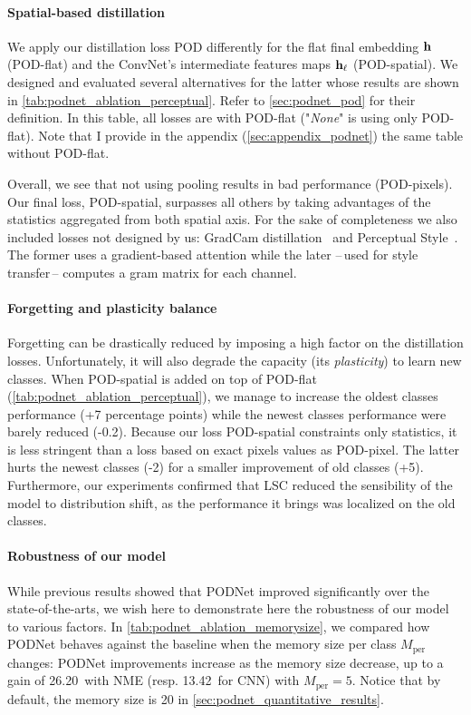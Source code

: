 \label{sec:podnet_ablation_pooling}
\paragraph{Spatial-based distillation} We apply our distillation loss \ac{POD} differently for the
flat final embedding $\mathbf{h}$ (POD-flat) and the \ac{ConvNet}'s intermediate features maps $\mathbf{h}_\ell$
(POD-spatial). We designed and evaluated several alternatives for the latter whose results are shown
in \autoref{tab:podnet_ablation_perceptual}.
Refer to \autoref{sec:podnet_pod} for their definition. In this table, all losses are with
POD-flat ("\textit{None}" is using only POD-flat). Note that I provide in the appendix
(\autoref{sec:appendix_podnet}) the same table without POD-flat.

Overall, we see that not using pooling results in bad performance (POD-pixels). Our final loss,
POD-spatial, surpasses all others by taking advantages of the statistics aggregated from both
spatial axis. For the sake of completeness we also included losses not designed by us: GradCam
distillation~\citep{dhar2019learning_without_memorizing_gradcam} and Perceptual
Style~\citep{johnson2016perceptual_losses}. The former uses a gradient-based attention while the
later --\,used for style transfer\,-- computes a gram matrix for each channel.

\paragraph{Forgetting and plasticity balance} Forgetting can be drastically reduced by imposing a
high factor on the distillation losses. Unfortunately, it will also degrade the capacity (its
\textit{plasticity}) to learn new classes. When POD-spatial is added on top of POD-flat
(\autoref{tab:podnet_ablation_perceptual}), we manage to increase the oldest classes performance (+7
percentage points) while the newest classes performance were barely reduced (-0.2\pp). Because our
loss POD-spatial constraints only statistics, it is less stringent than a loss based on exact pixels
values as POD-pixel. The latter hurts the newest classes (-2\pp) for a smaller improvement of old
classes (+5\pp). Furthermore, our experiments confirmed that LSC reduced the sensibility of the
model to distribution shift, as the performance it brings was localized on the old classes.

\label{sec:podnet_robustness}
\paragraph{Robustness of our model} While previous results showed that \ac{PODNet} improved
significantly over the state-of-the-arts, we wish here to demonstrate here the robustness of our
model to various factors. In \autoref{tab:podnet_ablation_memorysize}, we compared how \ac{PODNet}
behaves against the baseline when the memory size per class $M_{\text{per}}$ changes: \ac{PODNet}
improvements increase as the memory size decrease, up to a gain of 26.20\pp\ with \ac{NME} (resp.
13.42\pp\ for CNN) with $M_{\text{per}} = 5$. Notice that by default, the memory size is 20 in
\autoref{sec:podnet_quantitative_results}.

